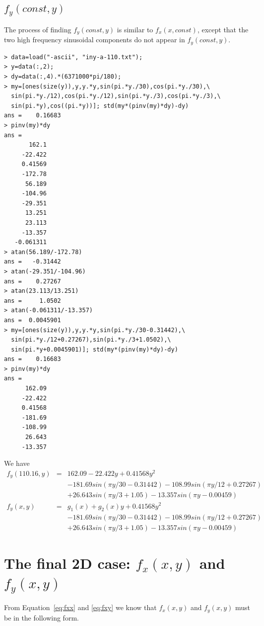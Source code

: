 \documentclass[a4paper]{article}
\begin{document}
\subsection{$f_y(const, y)$}

The process of finding $f_y(const, y)$ is similar to $f_x(x, const)$, except
that the two high frequency sinusoidal components do not appear in $f_y(const,
y)$.
\begin{verbatim}
> data=load("-ascii", "iny-a-110.txt");
> y=data(:,2);
> dy=data(:,4).*(6371000*pi/180);
> my=[ones(size(y)),y,y.*y,sin(pi.*y./30),cos(pi.*y./30),\
  sin(pi.*y./12),cos(pi.*y./12),sin(pi.*y./3),cos(pi.*y./3),\
  sin(pi.*y),cos((pi.*y))]; std(my*(pinv(my)*dy)-dy)
ans =    0.16683
> pinv(my)*dy
ans =
       162.1
     -22.422
     0.41569
     -172.78
      56.189
     -104.96
     -29.351
      13.251
      23.113
     -13.357
   -0.061311
> atan(56.189/-172.78)
ans =   -0.31442
> atan(-29.351/-104.96)
ans =    0.27267
> atan(23.113/13.251)
ans =     1.0502
> atan(-0.061311/-13.357)
ans =  0.0045901
> my=[ones(size(y)),y,y.*y,sin(pi.*y./30-0.31442),\
  sin(pi.*y./12+0.27267),sin(pi.*y./3+1.0502),\
  sin(pi.*y+0.0045901)]; std(my*(pinv(my)*dy)-dy)
ans =    0.16683
> pinv(my)*dy
ans =
      162.09
     -22.422
     0.41568
     -181.69
     -108.99
      26.643
     -13.357
\end{verbatim}

We have
\begin{eqnarray}
f_y(110.16,y) &=& 162.09-22.422y+0.41568y^2 \nonumber \\
              & & -181.69sin(\pi y/30-0.31442)-108.99sin(\pi y/12+0.27267) \nonumber \\
              & & +26.643sin(\pi y/3+1.05)-13.357sin(\pi y-0.00459) \\
f_y(x,y)      &=& g_1(x)+g_2(x)y+0.41568y^2 \nonumber \\
              & & -181.69sin(\pi y/30-0.31442)-108.99sin(\pi y/12+0.27267) \nonumber \\
              & & +26.643sin(\pi y/3+1.05)-13.357sin(\pi y-0.00459)
\end{eqnarray}

\section{The final 2D case: $f_x(x,y)$ and $f_y(x,y)$}

From Equation~\ref{eq:fxx} and \ref{eq:fxy} we know that $f_x(x,y)$ and
$f_y(x,y)$ must be in the following form.
\end{document}
